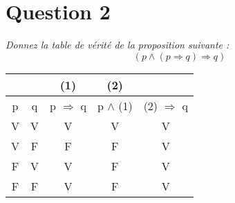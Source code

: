 \section*{Question 2}
\noindent
\emph{Donnez la table de vérité de la proposition suivante :}
\[(p \wedge (p \Rightarrow q) \Rightarrow q)\]

\smallskip
\begin{center}
	\begin{tabular}{|c|c|c|c|c|}
		\multicolumn{2}{c}{} & \multicolumn{1}{c}{(1)} & \multicolumn{1}{c}{(2)} &  \multicolumn{1}{c}{}\\ \hline
		p &        q         &    p $\Rightarrow$ q    &     p $\wedge$ (1)      & (2) $\Rightarrow$ q \\ \hline
		V &        V         &            V            &            V            &          V          \\ \hline
		V &        F         &            F            &            F            &          V          \\ \hline
		F &        V         &            V            &            F            &          V          \\ \hline
		F &        F         &            V            &            F            &          V          \\ \hline
	\end{tabular}
\end{center}